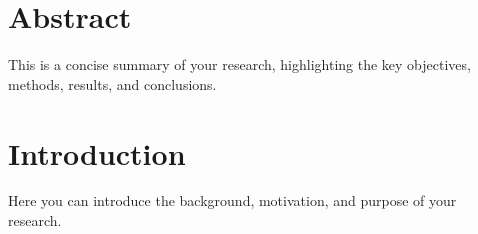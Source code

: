 \documentclass{article}
\begin{document}
\newpage
\tableofcontents %
\newpage

\section*{Abstract}
This is a concise summary of your research, highlighting the key objectives, methods, results, and conclusions. 

\section{Introduction}
Here you can introduce the background, motivation, and purpose of your research.

\end{document}

